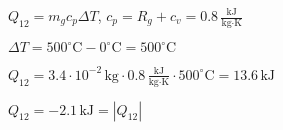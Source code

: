\( Q_{12} = m_g c_p \Delta T \), \( c_p = R_g + c_v = 0.8 \, \frac{\text{kJ}}{\text{kg·K}} \)  

\( \Delta T = 500^\circ \text{C} - 0^\circ \text{C} = 500^\circ \text{C} \)  

\( Q_{12} = 3.4 \cdot 10^{-2} \, \text{kg} \cdot 0.8 \, \frac{\text{kJ}}{\text{kg·K}} \cdot 500^\circ \text{C} = 13.6 \, \text{kJ} \)  

\( Q_{12} = -2.1 \, \text{kJ} = |Q_{12}| \)